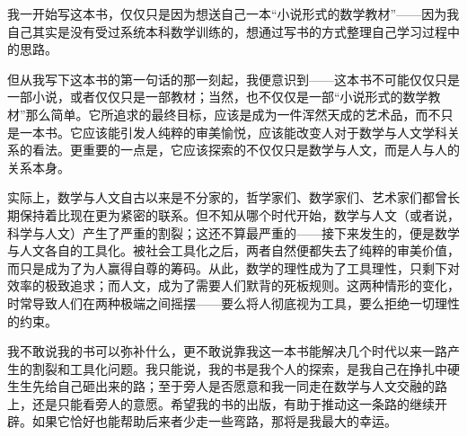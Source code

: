 

\vspace*{\fill}



\cleardoublepage
\pagecolor{white}
\color{black}

我一开始写这本书，仅仅只是因为想送自己一本“小说形式的数学教材”——因为我自己其实是没有受过系统本科数学训练的，想通过写书的方式整理自己学习过程中的思路。

但从我写下这本书的第一句话的那一刻起，我便意识到——这本书不可能仅仅只是一部小说，或者仅仅只是一部教材；当然，也不仅仅是一部“小说形式的数学教材”那么简单。它所追求的最终目标，应该是成为一件浑然天成的艺术品，而不只是一本书。它应该能引发人纯粹的审美愉悦，应该能改变人对于数学与人文学科关系的看法。更重要的一点是，它应该探索的不仅仅只是数学与人文，而是人与人的关系本身。

实际上，数学与人文自古以来是不分家的，哲学家们、数学家们、艺术家们都曾长期保持着比现在更为紧密的联系。但不知从哪个时代开始，数学与人文（或者说，科学与人文）产生了严重的割裂；这还不算最严重的——接下来发生的，便是数学与人文各自的工具化。被社会工具化之后，两者自然便都失去了纯粹的审美价值，而只是成为了为人赢得自尊的筹码。从此，数学的理性成为了工具理性，只剩下对效率的极致追求；而人文，成为了需要人们默背的死板规则。这两种情形的变化，时常导致人们在两种极端之间摇摆——要么将人彻底视为工具，要么拒绝一切理性的约束。

我不敢说我的书可以弥补什么，更不敢说靠我这一本书能解决几个时代以来一路产生的割裂和工具化问题。我只能说，我的书是我个人的探索，是我自己在挣扎中硬生生先给自己砸出来的路；至于旁人是否愿意和我一同走在数学与人文交融的路上，还是只能看旁人的意愿。希望我的书的出版，有助于推动这一条路的继续开辟。如果它恰好也能帮助后来者少走一些弯路，那将是我最大的幸运。




\cleardoublepage
\thispagestyle{empty}
\null
\cleardoublepage













\backmatter
\appendix
\color{black}
\pagecolor{white}
